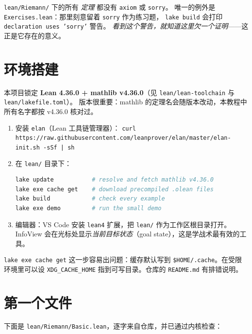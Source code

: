 \begin{warnbox}[本套代码的纪律]
\texttt{lean/Riemann/} 下的所有 \emph{定理} 都没有 \texttt{axiom} 或 \texttt{sorry}。
唯一的例外是 \texttt{Exercises.lean}：那里刻意留着 \texttt{sorry} 作为练习题，
\texttt{lake build} 会打印 \texttt{declaration uses 'sorry'} 警告。
\emph{看到这个警告，就知道这里欠一个证明}——这正是它存在的意义。
\end{warnbox}

\section{环境搭建}
\label{sec:06-setup}

本项目锁定 \textbf{Lean 4.36.0 + mathlib v4.36.0}（见
\texttt{lean/lean-toolchain} 与 \texttt{lean/lakefile.toml}）。
版本很重要：mathlib 的定理名会随版本改动，本教程中所有名字都按 v4.36.0 核对过。

\begin{enumerate}[label=\arabic*.]
  \item 安装 \texttt{elan}（Lean 工具链管理器）：
        \texttt{curl https://raw.githubusercontent.com/leanprover/elan/master/elan-init.sh -sSf | sh}
  \item 在 \texttt{lean/} 目录下：
\begin{lstlisting}[language=bash,numbers=none,frame=none,xleftmargin=0pt]
lake update           # resolve and fetch mathlib v4.36.0
lake exe cache get    # download precompiled .olean files
lake build            # check every example
lake exe demo         # run the small demo
\end{lstlisting}
  \item 编辑器：VS Code 安装 \texttt{lean4} 扩展，把 \texttt{lean/} 作为工作区根目录打开。
        InfoView 会在光标处显示\emph{当前目标状态}（goal state），这是学战术最有效的工具。
\end{enumerate}

\texttt{lake exe cache get} 这一步容易出问题：缓存默认写到
\texttt{\$HOME/.cache}。在受限环境里可以设
\texttt{XDG\_CACHE\_HOME} 指到可写目录。仓库的 \texttt{README.md} 有排错说明。

\section{第一个文件}
\label{sec:06-first}

下面是 \texttt{lean/Riemann/Basic.lean}，逐字来自仓库，并已通过内核检查：


